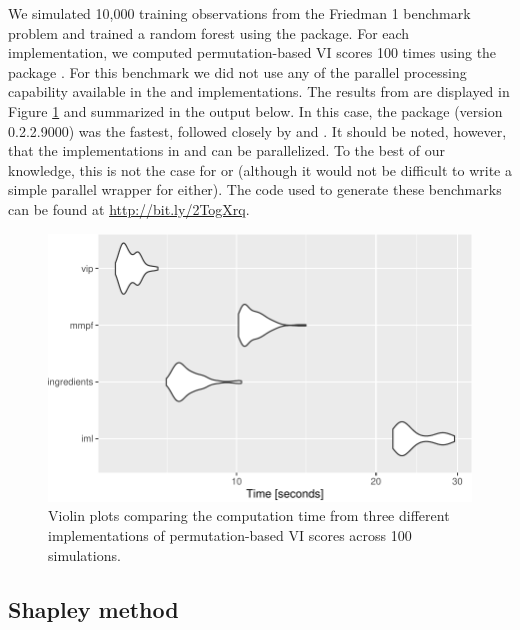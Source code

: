 We simulated 10,000 training observations from the Friedman 1 benchmark
problem and trained a random forest using the  package. For
each implementation, we computed permutation-based VI scores 100 times
using the  package \citep{R-microbenchmark}. For
this benchmark we did not use any of the parallel processing capability
available in the  and  implementations. The results
from  are displayed in Figure \ref{fig:benchmark}
and summarized in the output below. In this case, the  package
(version 0.2.2.9000) was the fastest, followed closely by
 and . It should be noted, however, that the
implementations in  and  can be parallelized. To the
best of our knowledge, this is not the case for  or
 (although it would not be difficult to write a simple
parallel wrapper for either). The code used to generate these benchmarks
can be found at \url{http://bit.ly/2TogXrq}.

\begin{Schunk}
\begin{figure}[!htb]

{\centering \includegraphics[width=0.7\linewidth]{greenwell-boehmke_files/figure-latex/benchmark-1}

}

\caption[Violin plots comparing the computation time from three different implementations of permutation-based VI scores across 100 simulations]{Violin plots comparing the computation time from three different implementations of permutation-based VI scores across 100 simulations.}\label{fig:benchmark}
\end{figure}
\end{Schunk}

\subsection{Shapley method}

